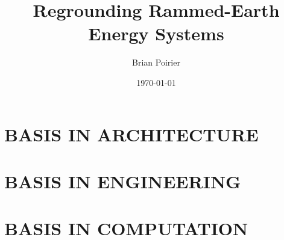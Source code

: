 \documentclass{article}
\begin{document}
\title{Regrounding Rammed-Earth Energy Systems}
\author{Brian Poirier}
\date{\today}
\maketitle
\clearpage

\tableofcontents
\clearpage



\clearpage

\section{BASIS IN ARCHITECTURE}

\clearpage

\section{BASIS IN ENGINEERING}

\clearpage


\section{BASIS IN COMPUTATION}

\clearpage





\nocite{}
\printbibliography
\end{document}
